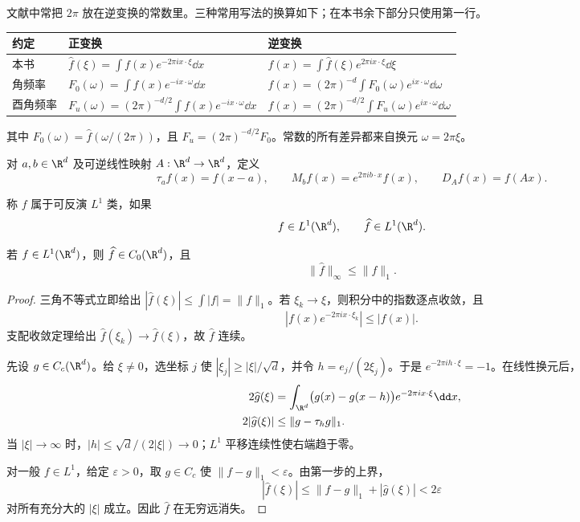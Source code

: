 文献中常把 $2\pi$ 放在逆变换的常数里。三种常用写法的换算如下；在本书余下部分只使用第一行。
\begin{center}
\renewcommand{\arraystretch}{1.25}
\small
\begin{tabularx}{\textwidth}{@{}p{2.0cm}XX@{}}
\toprule
约定 & 正变换 & 逆变换\\
\midrule
本书 & $\widehat f(\xi)=\int f(x)e^{-2\pi ix\cdot\xi}\dd x$
     & $f(x)=\int\widehat f(\xi)e^{2\pi ix\cdot\xi}\dd\xi$\\
角频率 & $F_0(\omega)=\int f(x)e^{-ix\cdot\omega}\dd x$
     & $f(x)=(2\pi)^{-d}\int F_0(\omega)e^{ix\cdot\omega}\dd\omega$\\
酉角频率 & $F_u(\omega)=(2\pi)^{-d/2}\int f(x)e^{-ix\cdot\omega}\dd x$
     & $f(x)=(2\pi)^{-d/2}\int F_u(\omega)e^{ix\cdot\omega}\dd\omega$\\
\bottomrule
\end{tabularx}
\end{center}
其中 $F_0(\omega)=\widehat f(\omega/(2\pi))$，且
$F_u=(2\pi)^{-d/2}F_0$。常数的所有差异都来自换元 $\omega=2\pi\xi$。

\begin{definition}[调制、平移与伸缩]\label{def:7-2-2-2}
对 $a,b\in\R^d$ 及可逆线性映射 $A:\R^d\to\R^d$，定义
\[
 \tau_af(x)=f(x-a),\qquad
 M_bf(x)=e^{2\pi ib\cdot x}f(x),\qquad
 D_Af(x)=f(Ax).
\]
\end{definition}

\begin{definition}[可反演 $L^1$ 类]\label{def:7-2-2-3}
称 $f$ 属于可反演 $L^1$ 类，如果
\[
 f\in L^1(\R^d),\qquad \widehat f\in L^1(\R^d).
\]
\end{definition}

\begin{theorem}\label{theorem:7-2-2-1}
若 $f\in L^1(\R^d)$，则 $\widehat f\in C_0(\R^d)$，且
\[
 \|\widehat f\|_\infty\leq\|f\|_1.
\]
\end{theorem}

\begin{proof}
三角不等式立即给出
$|\widehat f(\xi)|\leq\int|f|=\|f\|_1$。若 $\xi_k\to\xi$，则积分中的指数逐点收敛，且
\[
 |f(x)e^{-2\pi ix\cdot\xi_k}|\leq|f(x)|.
\]
支配收敛定理给出 $\widehat f(\xi_k)\to\widehat f(\xi)$，故 $\widehat f$ 连续。

先设 $g\in C_c(\R^d)$。给 $\xi\neq0$，选坐标 $j$ 使
$|\xi_j|\geq|\xi|/\sqrt d$，并令 $h=e_j/(2\xi_j)$。于是
$e^{-2\pi ih\cdot\xi}=-1$。在线性换元后，
\begin{align*}
 2\widehat g(\xi)
 &=\int_{\R^d}\bigl(g(x)-g(x-h)\bigr)e^{-2\pi ix\cdot\xi}\dd x,\\
 2|\widehat g(\xi)|&\leq\|g-\tau_hg\|_1.
\end{align*}
当 $|\xi|\to\infty$ 时，$|h|\leq\sqrt d/(2|\xi|)\to0$；$L^1$ 平移连续性使右端趋于零。

对一般 $f\in L^1$，给定 $\varepsilon>0$，取 $g\in C_c$ 使
$\|f-g\|_1<\varepsilon$。由第一步的上界，
\[
 |\widehat f(\xi)|
 \leq\|f-g\|_1+|\widehat g(\xi)|<2\varepsilon
\]
对所有充分大的 $|\xi|$ 成立。因此 $\widehat f$ 在无穷远消失。
\end{proof}

